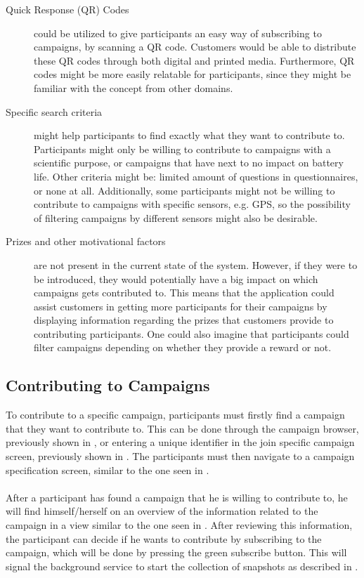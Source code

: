 \begin{description}
    \item[Quick Response (QR) Codes] could be utilized to give participants an easy way of subscribing to campaigns, by scanning a QR code. Customers would be able to distribute these QR codes through both digital and printed media. Furthermore, QR codes might be more easily relatable for participants, since they might be familiar with the concept from other domains.

    \item[Specific search criteria] might help participants to find exactly what they want to contribute to. Participants might only be willing to contribute to campaigns with a scientific purpose, or campaigns that have next to no impact on battery life. Other criteria might be: limited amount of questions in questionnaires, or none at all. Additionally, some participants might not be willing to contribute to campaigns with specific sensors, e.g. GPS, so the possibility of filtering campaigns by different sensors might also be desirable.

    \item[Prizes and other motivational factors] are not present in the current state of the system. However, if they were to be introduced, they would potentially have a big impact on which campaigns gets contributed to. This means that the application could assist customers in getting more participants for their campaigns by displaying information regarding the prizes that customers provide to contributing participants. One could also imagine that participants could filter campaigns depending on whether they provide a reward or not.
\end{description} 

\subsection{Contributing to Campaigns}
\label{sub:contributing_to_campaigns}

To contribute to a specific campaign, participants must firstly find a campaign that they want to contribute to. This can be done through the campaign browser, previously shown in , or entering a unique identifier in the join specific campaign screen, previously shown in . The participants must then navigate to a campaign specification screen, similar to the one seen in . 
\\\\
After a participant has found a campaign that he is willing to contribute to, he will find himself/herself on an overview of the information related to the campaign in a view similar to the one seen in . After reviewing this information, the participant can decide if he wants to contribute by subscribing to the campaign, which will be done by pressing the green subscribe button. This will signal the background service to start the collection of snapshots as described in .

